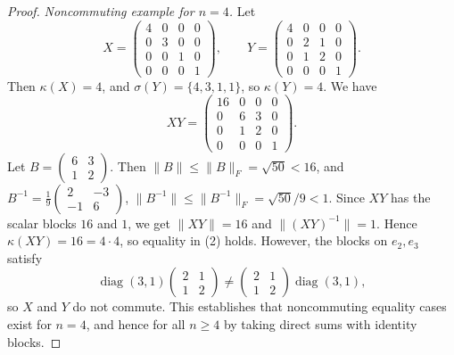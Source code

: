 \documentclass{article}
\theoremstyle{remark}
\begin{document}
\begin{proof}
\emph{Noncommuting example for $n=4$.} Let
\[
X=\begin{pmatrix}4&0&0&0\\0&3&0&0\\0&0&1&0\\0&0&0&1\end{pmatrix},\qquad
Y=\begin{pmatrix}4&0&0&0\\0&2&1&0\\0&1&2&0\\0&0&0&1\end{pmatrix}.
\]
Then $\kappa(X)=4$, and $\sigma(Y)=\{4,3,1,1\}$, so $\kappa(Y)=4$. We have
\[
XY=\begin{pmatrix}16&0&0&0\\0&6&3&0\\0&1&2&0\\0&0&0&1\end{pmatrix}.
\]
Let $B=\begin{pmatrix}6&3\\1&2\end{pmatrix}$. Then $\|B\|\le\|B\|_F=\sqrt{50}<16$, and $B^{-1}=\tfrac19\begin{pmatrix}2&-3\\-1&6\end{pmatrix}$, $\|B^{-1}\|\le\|B^{-1}\|_F=\sqrt{50}/9<1$. Since $XY$ has the scalar blocks $16$ and $1$, we get $\|XY\|=16$ and $\|(XY)^{-1}\|=1$. Hence $\kappa(XY)=16=4\cdot4$, so equality in (2) holds. However, the blocks on $e_2,e_3$ satisfy
\[
\operatorname{diag}(3,1)\begin{pmatrix}2&1\\1&2\end{pmatrix} \neq \begin{pmatrix}2&1\\1&2\end{pmatrix}\operatorname{diag}(3,1),
\]
so $X$ and $Y$ do not commute. This establishes that noncommuting equality cases exist for $n=4$, and hence for all $n\ge4$ by taking direct sums with identity blocks.
\end{proof}
\end{document}
